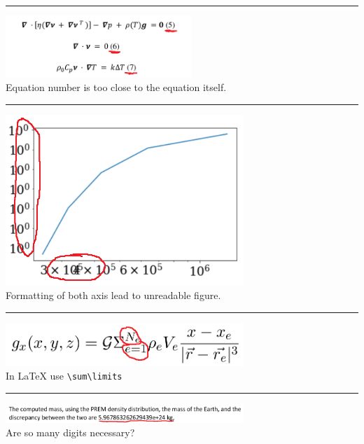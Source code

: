 \par\noindent\rule{\textwidth}{0.4pt}
\begin{center}
\includegraphics[width=7cm]{images/grading/eqs3}\\
Equation number is too close to the equation itself.
\end{center}

\par\noindent\rule{\textwidth}{0.4pt}
\begin{center}
\includegraphics[width=9cm]{images/grading/eqs4}\\
Formatting of both axis lead to unreadable figure.
\end{center}

\par\noindent\rule{\textwidth}{0.4pt}
\begin{center}
\includegraphics[width=9cm]{images/grading/eqs5}\\
In \LaTeX{}  use \verb!\sum\limits!
\end{center}

\par\noindent\rule{\textwidth}{0.4pt}
\begin{center}
\includegraphics[width=9cm]{images/grading/eqs6}\\
Are so many digits necessary?
\end{center}


